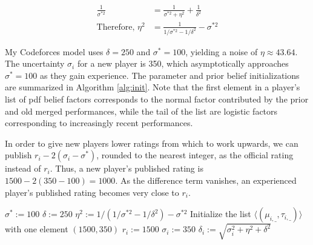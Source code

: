 \documentclass{article}
\begin{document}
\begin{align}
\frac{1}{\sigma^{*2}} &= \frac{1}{\sigma^{*2} + \eta^2} + \frac{1}{\delta^2}
\\ \text{Therefore, }\eta^2 &= \frac{1}{1/\sigma^{*2} - 1/\delta^2} - \sigma^{*2}
\end{align}

My Codeforces model uses $\delta = 250$ and $\sigma^* = 100$, yielding a noise of $\eta \approx 43.64$. The uncertainty $\sigma_i$ for a new player is 350, which asymptotically approaches $\sigma^* = 100$ as they gain experience. The parameter and prior belief initializations are summarized in Algorithm \ref{alg:init}. Note that the first element in a player's list of pdf belief factors corresponds to the normal factor contributed by the prior and old merged performances, while the tail of the list are logistic factors corresponding to increasingly recent performances.

In order to give new players lower ratings from which to work upwards, we can publish $r_i - 2(\sigma_i - \sigma^*)$, rounded to the nearest integer, as the official rating instead of $r_i$. Thus, a new player's published rating is $1500 - 2(350-100) = 1000$. As the difference term vanishes, an experienced player's published rating becomes very close to $r_i$.

\begin{algorithm}
\caption{$init()$}
\label{alg:init}
\begin{algorithmic}
\STATE $\sigma^* := 100$
\STATE $\delta := 250$
\STATE $\eta^2 := 1 / \left( 1/\sigma^{*2} - 1/\delta^2 \right) - \sigma^{*2}$
\STATE Initialize the list $\langle( \mu_{i,\_},\tau_{i,\_} )\rangle$ with one element $(1500, 350)$
\STATE $r_i := 1500$
\STATE $\sigma_i := 350$
\STATE $\delta_i := \sqrt{\sigma_i^2 + \eta^2 + \delta^2}$
\ENDFOR
\end{algorithmic}
\end{algorithm}
\end{document}
